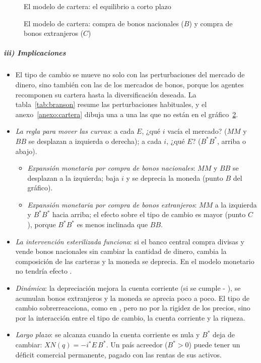 \documentclass[11pt]{article}
\begin{document}
\begin{figure}[H]
\centering
\caption{El modelo de cartera: el equilibrio a corto plazo}\label{fig:branson-equilibrio}
\end{figure}

\begin{figure}[H]
\centering
\caption{El modelo de cartera: compra de bonos nacionales ($B$) y compra de bonos extranjeros ($C$)}\label{fig:branson}
\end{figure}

\subparagraph{iii) Implicaciones}
\begin{itemize}
\item El tipo de cambio se mueve no solo con las perturbaciones del mercado de dinero, sino también con las de los mercados de bonos, porque los agentes recomponen su cartera hasta la diversificación deseada. La tabla~\ref{tab:branson} resume las perturbaciones habituales, y el anexo~\ref{anexo:cartera} dibuja una a una las que no están en el gráfico~\ref{fig:branson}.
\item \emph{La regla para mover las curvas}: a cada $E$, ¿qué $i$ vacía el mercado? ($MM$ y $BB$ se desplazan a izquierda o derecha); a cada $i$, ¿qué $E$? ($B^*B^*$, arriba o abajo).
  \begin{itemize}
  \item \emph{Expansión monetaria por compra de bonos nacionales}: $MM$ y $BB$ se desplazan a la izquierda; baja $i$ y se deprecia la moneda (punto $B$ del gráfico).
  \item \emph{Expansión monetaria por compra de bonos extranjeros}: $MM$ a la izquierda y $B^*B^*$ hacia arriba; el efecto sobre el tipo de cambio es mayor (punto $C$), porque $B^*B^*$ es menos inclinada que $BB$.
  \end{itemize}
\item \emph{La intervención esterilizada funciona}: si el banco central compra divisas y vende bonos nacionales sin cambiar la cantidad de dinero, cambia la composición de las carteras y la moneda se deprecia. En el modelo monetario no tendría efecto .
\item \emph{Dinámica}: la depreciación mejora la cuenta corriente (si se cumple - ), se acumulan bonos extranjeros y la moneda se aprecia poco a poco. El tipo de cambio sobrerreacciona, como en , pero no por la rigidez de los precios, sino por la interacción entre el tipo de cambio, la cuenta corriente y la riqueza.
\item \emph{Largo plazo}: se alcanza cuando la cuenta corriente es nula y $B^*$ deja de cambiar: $XN(q)=-i^*E\,B^*$. Un país acreedor ($B^*>0$) puede tener un déficit comercial permanente, pagado con las rentas de sus activos.
\end{itemize}
\end{document}
